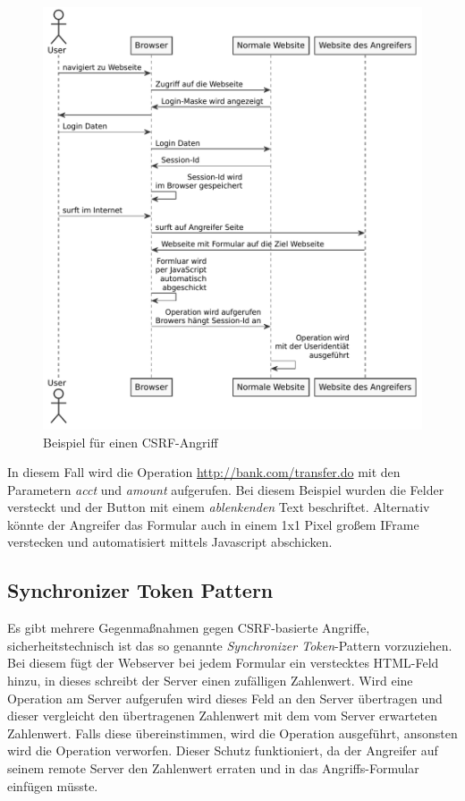 \begin{figure}
	\includegraphics[width=\textwidth]{graphs/csrf.pdf}
	\centering
	\caption{Beispiel für einen CSRF-Angriff}
\end{figure}

In diesem Fall wird die Operation \url{http://bank.com/transfer.do} mit den Parametern \textit{acct} und \textit{amount} aufgerufen. Bei diesem Beispiel wurden die Felder versteckt und der Button mit einem \textit{ablenkenden} Text beschriftet. Alternativ könnte der Angreifer das Formular auch in einem 1x1 Pixel großem IFrame verstecken und automatisiert mittels Javascript abschicken.

\subsection{Synchronizer Token Pattern}

Es gibt mehrere Gegenmaßnahmen gegen CSRF-basierte Angriffe, sicherheitstechnisch ist das so genannte \textit{Synchronizer Token}-Pattern vorzuziehen. Bei diesem fügt der Webserver bei jedem Formular ein verstecktes HTML-Feld hinzu, in dieses schreibt der Server einen zufälligen Zahlenwert. Wird eine Operation am Server aufgerufen wird dieses Feld an den Server übertragen und dieser vergleicht den übertragenen Zahlenwert mit dem vom Server erwarteten Zahlenwert. Falls diese übereinstimmen, wird die Operation ausgeführt, ansonsten wird die Operation verworfen. Dieser Schutz funktioniert, da der Angreifer auf seinem remote Server den Zahlenwert erraten und in das Angriffs-Formular einfügen müsste.

